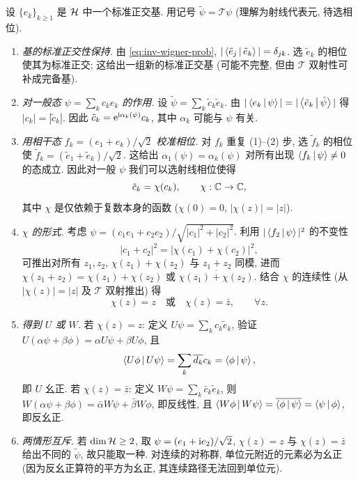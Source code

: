\begin{proof*}[证明 (梗概)]
设 $\{e_k\}_{k\ge 1}$ 是 $\mathcal{H}$ 中一个标准正交基. 用记号 $\tilde{\psi}=\mathcal{T}\psi$ (理解为射线代表元, 待选相位).
\begin{enumerate}
\item \emph{基的标准正交性保持.} 由 \eqref{eq:inv-wigner-prob}, $|\left\langle \tilde{e}_j \,\middle|\, \tilde{e}_k \right\rangle|=\delta_{jk}$. 选 $\tilde{e}_k$ 的相位使其为标准正交; 这给出一组新的标准正交基 (可能不完整, 但由 $\mathcal{T}$ 双射性可补成完备基).

\item \emph{对一般态 $\psi=\sum_k c_k e_k$ 的作用.}
设 $\tilde{\psi}=\sum_k \tilde{c}_k \tilde{e}_k$. 由 $|\left\langle e_k \,\middle|\, \psi \right\rangle|=|\left\langle \tilde{e}_k \,\middle|\, \tilde{\psi} \right\rangle|$ 得 $|c_k|=|\tilde{c}_k|$. 因此 $\tilde{c}_k=\mathrm{e}^{\mathrm{i} \alpha_k(\psi)}c_k$, 其中 $\alpha_k$ 可能与 $\psi$ 有关.

\item \emph{用相干态 $f_k=(e_1+e_k)/\sqrt{2}$ 校准相位.}
对 $f_k$ 重复 (1)--(2) 步, 选 $\tilde{f}_k$ 的相位使 $\tilde{f}_k=(\tilde{e}_1+\tilde{e}_k)/\sqrt{2}$. 这给出 $\alpha_1(\psi)=\alpha_k(\psi)$ 对所有出现 $\left\langle f_k \,\middle|\, \psi \right\rangle\ne 0$ 的态成立. 因此对一般 $\psi$ 我们可以选射线相位使得
\begin{equation}\label{eq:inv-wigner-c}
\tilde{c}_k = \chi(c_k),\qquad \chi:\mathbb{C}\to \mathbb{C},
\end{equation}
其中 $\chi$ 是仅依赖于复数本身的函数 ($\chi(0)=0$, $|\chi(z)|=|z|$).

\item \emph{$\chi$ 的形式.}
考虑 $\psi=(c_1 e_1+c_2 e_2)/\sqrt{|c_1|^2+|c_2|^2}$. 利用 $|\left\langle f_2 \,\middle|\, \psi \right\rangle|^2$ 的不变性
\[
|c_1+c_2|^2 = |\chi(c_1)+\chi(c_2)|^2,
\]
可推出对所有 $z_1,z_2$, $\chi(z_1)+\chi(z_2)$ 与 $z_1+z_2$ 同模, 进而 $\chi(z_1+z_2)=\chi(z_1)+\chi(z_2)$ 或 $\overline{\chi(z_1)+\chi(z_2)}$. 结合 $\chi$ 的连续性 (从 $|\chi(z)|=|z|$ 及 $\mathcal{T}$ 双射推出) 得
\[
\chi(z)=z\quad \text{或}\quad \chi(z)=\bar{z},\qquad \forall z.
\]

\item \emph{得到 $U$ 或 $W$.}
若 $\chi(z)=z$: 定义 $U\psi=\sum_k c_k \tilde{e}_k$, 验证 $U(\alpha\psi+\beta\phi)=\alpha U\psi+\beta U\phi$, 且
\[
\left\langle U\phi \,\middle|\, U\psi \right\rangle=\sum_k \overline{d_k}c_k=\left\langle \phi \,\middle|\, \psi \right\rangle,
\]
即 $U$ 幺正.
若 $\chi(z)=\bar{z}$: 定义 $W\psi=\sum_k \bar{c}_k \tilde{e}_k$, 则 $W(\alpha \psi+\beta \phi)=\bar{\alpha}W\psi+\bar{\beta}W\phi$, 即反线性, 且 $\left\langle W\phi \,\middle|\, W\psi \right\rangle=\overline{\left\langle \phi \,\middle|\, \psi \right\rangle}=\left\langle \psi \,\middle|\, \phi \right\rangle$, 即反幺正.

\item \emph{两情形互斥.}
若 $\dim \mathcal{H} \ge 2$, 取 $\psi=(e_1+\mathrm{i} e_2)/\sqrt{2}$, $\chi(z)=z$ 与 $\chi(z)=\bar{z}$ 给出不同的 $\tilde{\psi}$, 故只能取一种. 对连续的对称群, 单位元附近的元素必为幺正 (因为反幺正算符的平方为幺正, 其连续路径无法回到单位元).
\end{enumerate}
\end{proof*}

